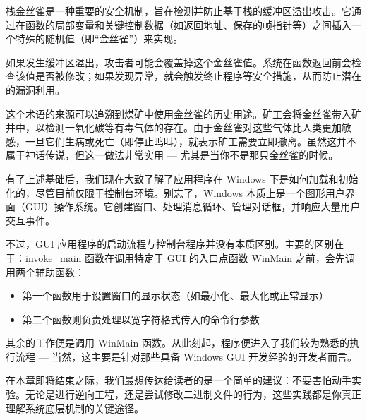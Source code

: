 栈金丝雀是一种重要的安全机制，旨在检测并防止基于栈的缓冲区溢出攻击。它通过在函数的局部变量和关键控制数据（如返回地址、保存的帧指针等）之间插入一个特殊的随机值（即“金丝雀”）来实现。

如果发生缓冲区溢出，攻击者可能会覆盖掉这个金丝雀值。系统在函数返回前会检查该值是否被修改；如果发现异常，就会触发终止程序等安全措施，从而防止潜在的漏洞利用。

这个术语的来源可以追溯到煤矿中使用金丝雀的历史用途。矿工会将金丝雀带入矿井中，以检测一氧化碳等有毒气体的存在。由于金丝雀对这些气体比人类更加敏感，一旦它们生病或死亡（即停止鸣叫），就表示矿工需要立即撤离。虽然这并不属于神话传说，但这一做法非常实用 --- 尤其是当你不是那只金丝雀的时候。

有了上述基础后，我们现在大致了解了应用程序在 Windows 下是如何加载和初始化的，尽管目前仅限于控制台环境。别忘了，Windows 本质上是一个图形用户界面（GUI）操作系统。它创建窗口、处理消息循环、管理对话框，并响应大量用户交互事件。

不过，GUI 应用程序的启动流程与控制台程序并没有本质区别。主要的区别在于：invoke\_main 函数在调用特定于 GUI 的入口点函数 WinMain 之前，会先调用两个辅助函数：

\begin{itemize}
\item 
第一个函数用于设置窗口的显示状态（如最小化、最大化或正常显示）

\item 
第二个函数则负责处理以宽字符格式传入的命令行参数
\end{itemize}

其余的工作便是调用 WinMain 函数。从此刻起，程序便进入了我们较为熟悉的执行流程 --- 当然，这主要是针对那些具备 Windows GUI 开发经验的开发者而言。

在本章即将结束之际，我们最想传达给读者的是一个简单的建议：不要害怕动手实验。无论是进行逆向工程，还是尝试修改二进制文件的行为，这些实践都是你真正理解系统底层机制的关键途径。





